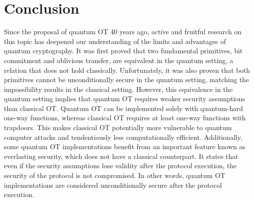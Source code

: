 

\section{Conclusion}

Since the proposal of quantum OT 40 years ago, active and fruitful research on this topic has deepened our understanding of the limits and advantages of quantum cryptography. It was first proved that two fundamental primitives, bit commitment and oblivious transfer, are equivalent in the quantum setting, a relation that does not hold classically. Unfortunately, it was also proven that both primitives cannot be unconditionally secure in the quantum setting, matching the impossibility results in the classical setting. However, this equivalence in the quantum setting implies that quantum OT requires weaker security assumptions than classical OT. Quantum OT can be implemented solely with quantum-hard one-way functions, whereas classical OT requires at least one-way functions with trapdoors. This makes classical OT potentially more vulnerable to quantum computer attacks and tendentiously less computationally efficient. Additionally, some quantum OT implementations benefit from an important feature known as everlasting security, which does not have a classical counterpart. It states that even if the security assumptions lose validity after the protocol execution, the security of the protocol is not compromised. In other words, quantum OT implementations are considered unconditionally secure after the protocol execution.

